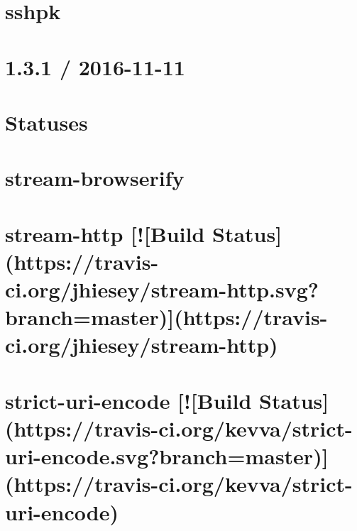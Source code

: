 \documentclass[twoside]{book}
\newcommand{\+}{\discretionary{\mbox{\scriptsize$\hookleftarrow$}}{}{}}
\begin{document}
\chapter{sshpk}
\label{md__c_1_workspace_demo_src_main_script_node_modules_sshpk__r_e_a_d_m_e}

\chapter{1.3.1 / 2016-\/11-\/11}
\label{md__c_1_workspace_demo_src_main_script_node_modules_statuses__h_i_s_t_o_r_y}

\chapter{Statuses}
\label{md__c_1_workspace_demo_src_main_script_node_modules_statuses__r_e_a_d_m_e}

\chapter{stream-\/browserify}
\label{md__c_1_workspace_demo_src_main_script_node_modules_stream-browserify_readme}

\chapter{stream-\/http \mbox{[}!\mbox{[}Build Status\mbox{]}(https\+://travis-\/ci.org/jhiesey/stream-\/http.svg?branch=master)\mbox{]}(https\+://travis-\/ci.org/jhiesey/stream-\/http)}
\label{md__c_1_workspace_demo_src_main_script_node_modules_stream-http__r_e_a_d_m_e}

\chapter{strict-\/uri-\/encode \mbox{[}!\mbox{[}Build Status\mbox{]}(https\+://travis-\/ci.org/kevva/strict-\/uri-\/encode.svg?branch=master)\mbox{]}(https\+://travis-\/ci.org/kevva/strict-\/uri-\/encode)}
\label{md__c_1_workspace_demo_src_main_script_node_modules_strict-uri-encode_readme}

\end{document}
